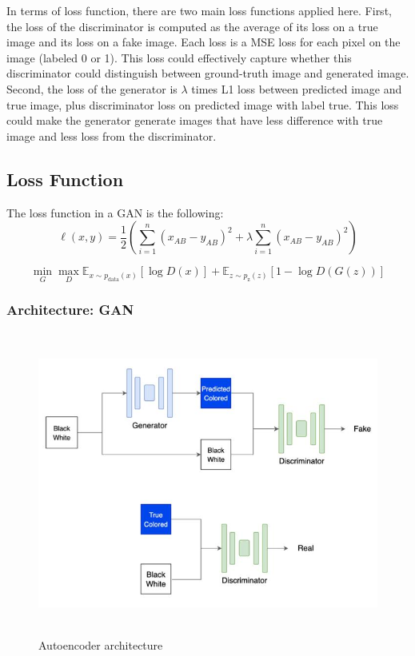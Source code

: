 \documentclass{article}
\begin{document}
In terms of loss function, there are two main loss functions applied here. 
First, the loss of the discriminator is computed as the average of its loss on a true image and its loss on a fake image. 
Each loss is a MSE loss for each pixel on the image (labeled 0 or 1). 
This loss could effectively capture whether this discriminator could distinguish between ground-truth image and generated image.
Second, the loss of the generator is $\lambda$ times L1 loss between predicted image and true image, plus discriminator loss on predicted image with label true.
This loss could make the generator generate images that have less difference with true image and less loss from the discriminator.

\subsection{Loss Function}
The loss function in a GAN is the following:
{\Large
\begin{equation}
    \ell(x,y) = \frac{1}{2} \left( \sum_{i=1}^{n} \left( x_{AB} - y_{AB} \right)^2 + \lambda \sum_{i=1}^{n} \left( x_{AB} - y_{AB} \right)^2 \right)
\end{equation}
}

{\Large
\begin{equation}
\min_{G}\max_{D}\mathbb{E}_{x\sim p_{\text{data}}(x)}[\log{D(x)}] +  \mathbb{E}_{z\sim p_{\text{z}}(z)}[1 - \log{D(G(z))}]
\end{equation}
}

\subsubsection{Architecture: GAN}

\begin{figure}[htbp!]
    \centering
        \includegraphics[width=15cm, height=10cm]{gan.jpg}
        \caption{Autoencoder architecture}
\end{figure}
\end{document}
